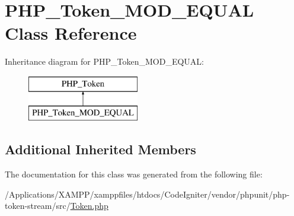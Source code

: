 \hypertarget{class_p_h_p___token___m_o_d___e_q_u_a_l}{}\section{P\+H\+P\+\_\+\+Token\+\_\+\+M\+O\+D\+\_\+\+E\+Q\+U\+AL Class Reference}
\label{class_p_h_p___token___m_o_d___e_q_u_a_l}
Inheritance diagram for P\+H\+P\+\_\+\+Token\+\_\+\+M\+O\+D\+\_\+\+E\+Q\+U\+AL\+:\begin{figure}[H]
\begin{center}
\leavevmode
\includegraphics[height=2.000000cm]{class_p_h_p___token___m_o_d___e_q_u_a_l}
\end{center}
\end{figure}
\subsection*{Additional Inherited Members}


The documentation for this class was generated from the following file\+:\begin{DoxyCompactItemize}
\item 
/\+Applications/\+X\+A\+M\+P\+P/xamppfiles/htdocs/\+Code\+Igniter/vendor/phpunit/php-\/token-\/stream/src/\mbox{\hyperlink{_token_8php}{Token.\+php}}\end{DoxyCompactItemize}
